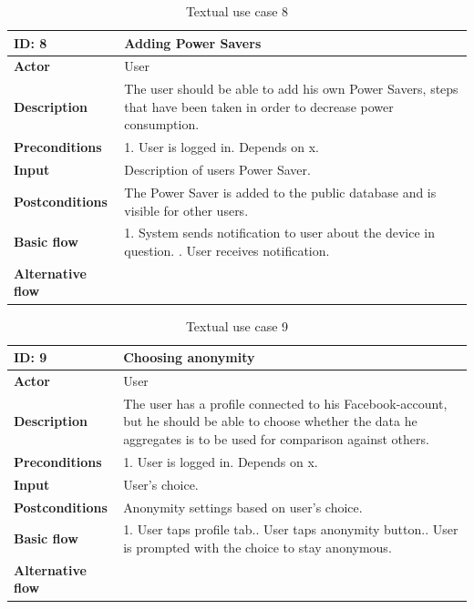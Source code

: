 \begin{table}[H]
\begin{tabular}{|l|p{11.7cm}|}
\hline
\textbf{ID: }8&\textbf{Adding Power Savers}
\\\hline
\textbf{Actor} &User
\\\hline
\textbf{Description}&
The user should be able to add his own Power Savers, steps that have been taken in order to decrease power consumption.\\\hline
\textbf{Preconditions}&
1. User is logged in.\newline
Depends on x.\\\hline
\textbf{Input}&
Description of users Power Saver.
\\\hline
\textbf{Postconditions}& 
The Power Saver is added to the public database and is visible for other users.
\\\hline
\textbf{Basic flow}&
1. System sends notification to user about the device in question. \newline
2. User receives notification.\newline
\\\hline
\textbf{Alternative flow}&\\\hline
\end{tabular}
\caption{Textual use case 8}
\end{table}


\begin{table}[H]
\begin{tabular}{|l|p{11.7cm}|}
\hline
\textbf{ID: }9&\textbf{Choosing anonymity}
\\\hline
\textbf{Actor} &User
\\\hline
\textbf{Description}&
The user has a profile connected to his Facebook-account, but he should be able to choose whether the data he aggregates is to be used for comparison against others.\\\hline
\textbf{Preconditions}&
1. User is logged in.\newline
Depends on x.\\\hline
\textbf{Input}&
User's choice.
\\\hline
\textbf{Postconditions}& 
Anonymity settings based on user's choice.
\\\hline
\textbf{Basic flow}&
1. User taps profile tab.\newline
2. User taps anonymity button.\newline
3. User is prompted with the choice to stay anonymous.\newline
\\\hline
\textbf{Alternative flow}&\\\hline
\end{tabular}
\caption{Textual use case 9}
\end{table}


